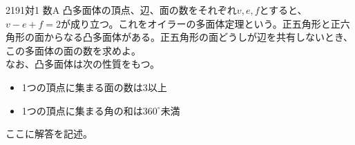 \begin{prob}{219}{}{1対1 数A}
 凸多面体の頂点、辺、面の数をそれぞれ$v, e, f$とすると、$v-e+f=2$が成り立つ。これをオイラーの多面体定理という。正五角形と正六角形の面からなる凸多面体がある。正五角形の面どうしが辺を共有しないとき、この多面体の面の数を求めよ。\\
 なお、凸多面体は次の性質をもつ。
 \begin{itemize}
  \item 1つの頂点に集まる面の数は3以上
  \item 1つの頂点に集まる角の和は$360^\circ$未満
 \end{itemize}
\end{prob}
ここに解答を記述。